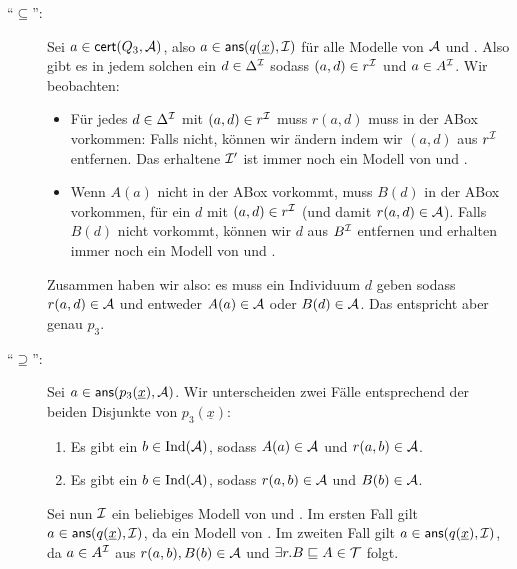 \documentclass[fontsize=11pt, twoside=false, numbers=autoenddot]{scrbook}
\begin{document}
\begin{description}
  \item[{\boldmath "`$\subseteq$"':}]
    Sei $a\in\textsf{cert}(Q_3,\mathcal{A})$, also
    $a\in\textsf{ans}(q(\underline x),\mathcal{I})$ für alle Modelle \Imc von
    $\mathcal{A}$ und \Tmc. Also gibt es in jedem solchen \Imc ein
    $d\in\Delta^\mathcal{I}$ sodass $(a,d)\in r^\mathcal{I}$ und $a\in A^\mathcal{I}$. Wir
    beobachten:
    \begin{itemize}
    
      \item Für jedes $d\in\Delta^\mathcal{I}$ mit $(a,d)\in r^\mathcal{I}$ muss 
        $r(a,d)$ muss in der ABox vorkommen: Falls nicht, können wir
        \Imc ändern indem wir $(a,d)$ aus $r^\mathcal{I}$ entfernen. Das
        erhaltene $\mathcal{I}'$ ist immer noch ein Modell von \Amc und \Tmc.
    
      \item Wenn $A(a)$ nicht in der ABox vorkommt, muss $B(d)$ in der
        ABox vorkommen, für ein $d$ mit $(a,d)\in r^\mathcal{I}$ (und damit
        $r(a,d)\in \mathcal{A}$). Falls $B(d)$ nicht vorkommt, können wir
        $d$ aus $B^\mathcal{I}$ entfernen und erhalten immer noch ein Modell von
        \Amc und \Tmc.
    
    \end{itemize}
    Zusammen haben wir also: es muss ein Individuum $d$ geben sodass
    $r(a,d)\in \mathcal{A}$ und entweder $A(a)\in \mathcal{A}$ oder $B(d)\in \mathcal{A}$. Das
    entspricht aber genau $p_3$.
  \item[{\boldmath "`$\supseteq$"':}]
    Sei $a\in \textsf{ans}(p_3(\underline
    x),\mathcal{A})$. Wir unterscheiden zwei Fälle entsprechend der beiden
    Disjunkte von $p_3(\underline x)$:
    \begin{enumerate}
    
      \item Es gibt ein $b\in\text{Ind}(\mathcal{A})$, sodass $A(a)\in\mathcal{A}$ und
        $r(a,b)\in \mathcal{A}$.
    
      \item Es gibt ein $b\in\text{Ind}(\mathcal{A})$, sodass 
        $r(a,b)\in \mathcal{A}$ und $B(b)\in \mathcal{A}$.
    
    \end{enumerate}
    Sei nun $\mathcal{I}$ ein beliebiges Modell von \Amc und \Tmc. Im ersten Fall
    gilt $a\in \textsf{ans}(q(\underline x),\mathcal{I})$, da \Imc ein Modell von \Amc. Im
    zweiten Fall gilt $a\in \textsf{ans}(q(\underline x),\mathcal{I})$, da
    $a\in A^\mathcal{I}$ aus $r(a,b),B(b)\in \mathcal{A}$ und $\exists r.B\sqsubseteq
    A\in\mathcal{T}$ folgt. 
\end{description}
\end{document}
